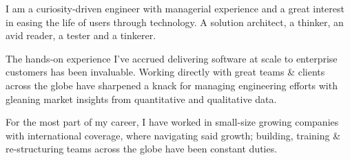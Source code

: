 I am a curiosity-driven engineer with managerial experience and a great interest in easing the life of users through technology. A solution architect, a thinker, an avid reader, a tester and a tinkerer.

The hands-on experience I've accrued delivering software at scale to enterprise customers has been invaluable. Working directly with great teams \& clients across the globe have sharpened a knack for managing engineering efforts with gleaning market insights from quantitative and qualitative data.

For the most part of my career, I have worked in small-size growing companies with international coverage, where navigating said growth; building, training \& re-structuring teams across the globe have been constant duties.